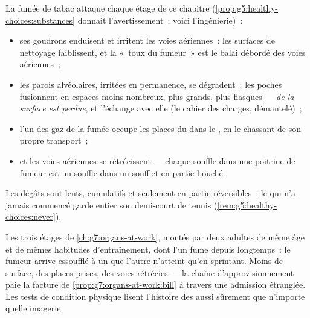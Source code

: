 \begin{proposition}\label{prop:g7:lungs-and-gas-exchange:smoke}
La fumée de tabac attaque chaque étage de ce chapitre
(\cref{prop:g5:healthy-choices:substances} donnait
l'avertissement~; voici l'ingénierie)~:
\begin{itemize}
  \item ses goudrons enduisent et irritent les voies aériennes~:
        les surfaces de nettoyage faiblissent, et la «~toux du
        fumeur~» est le balai débordé des voies aériennes~;
  \item les parois alvéolaires, irritées en permanence, se
        dégradent~: les poches fusionnent en espaces moins
        nombreux, plus grands, plus flasques --- \emph{de la surface
        est perdue}, et l'échange avec elle (le cahier des charges,
        démantelé)~;
  \item l'un des gaz de la fumée occupe les places du 
        dans le , en le chassant de son propre transport~;
  \item et les voies aériennes se rétrécissent --- chaque souffle
        dans une poitrine de fumeur est un souffle dans un soufflet
        en partie bouché.
\end{itemize}
Les dégâts sont lents, cumulatifs et seulement en partie
réversibles~: le  qui n'a jamais commencé garde entier son
demi-court de tennis (\cref{rem:g5:healthy-choices:never}).
\end{proposition}
\admitted

\begin{example}\label{ex:g7:lungs-and-gas-exchange:stairs}
Les trois étages de \cref{ch:g7:organs-at-work}, montés par deux
adultes de même âge et de mêmes habitudes d'entraînement, dont l'un
fume depuis longtemps~: le fumeur arrive essoufflé à un  que
l'autre n'atteint qu'en sprintant. Moins de surface, des places
prises, des voies rétrécies --- la chaîne d'approvisionnement paie
la facture de \cref{prop:g7:organs-at-work:bill} à travers une
admission étranglée. Les tests de condition physique lisent
l'histoire des  aussi sûrement que n'importe quelle imagerie.
\end{example}

